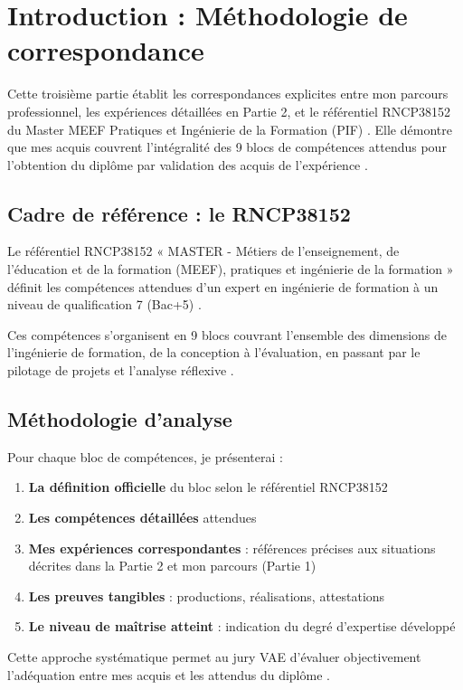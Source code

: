 \chapter{Introduction : Méthodologie de correspondance}

Cette troisième partie établit les correspondances explicites entre mon parcours professionnel, les expériences détaillées en Partie 2, et le référentiel RNCP38152 du Master MEEF Pratiques et Ingénierie de la Formation (PIF) \parencite{rncp38152}. Elle démontre que mes acquis couvrent l'intégralité des 9 blocs de compétences attendus pour l'obtention du diplôme par validation des acquis de l'expérience \parencite{vademecum_vae_inspe}.

\section{Cadre de référence : le RNCP38152}

Le référentiel RNCP38152 « MASTER - Métiers de l'enseignement, de l'éducation et de la formation (MEEF), pratiques et ingénierie de la formation » définit les compétences attendues d'un expert en ingénierie de formation à un niveau de qualification 7 (Bac+5) \parencite{rncp38152,referentiel_meef}.

Ces compétences s'organisent en 9 blocs couvrant l'ensemble des dimensions de l'ingénierie de formation, de la conception à l'évaluation, en passant par le pilotage de projets et l'analyse réflexive \parencite{competences_transversales}.

\section{Méthodologie d'analyse}

Pour chaque bloc de compétences, je présenterai :

\begin{enumerate}[leftmargin=*]
    \item \textbf{La définition officielle} du bloc selon le référentiel RNCP38152
    \item \textbf{Les compétences détaillées} attendues
    \item \textbf{Mes expériences correspondantes} : références précises aux situations décrites dans la Partie 2 et mon parcours (Partie 1)
    \item \textbf{Les preuves tangibles} : productions, réalisations, attestations
    \item \textbf{Le niveau de maîtrise atteint} : indication du degré d'expertise développé
\end{enumerate}

Cette approche systématique permet au jury VAE d'évaluer objectivement l'adéquation entre mes acquis et les attendus du diplôme \parencite{vademecum_vae_inspe}.
